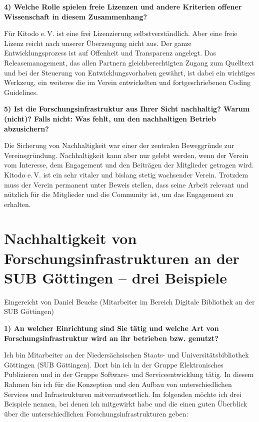 \documentclass[a4paper,
fontsize=11pt,
oneside,
numbers=noperiodatend,
parskip=half-,
bibliography=totoc,
final
]{scrartcl}
\begin{document}
\textbf{4) Welche Rolle spielen freie Lizenzen und andere Kriterien
offener Wissenschaft in diesem Zusammenhang?}

Für Kitodo e.\,V. ist eine frei Lizenzierung selbstverständlich. Aber
eine freie Lizenz reicht nach unserer Überzeugung nicht aus. Der ganze
Entwicklungsprozess ist auf Offenheit und Transparenz angelegt. Das
Releasemanagement, das allen Partnern gleichberechtigten Zugang zum
Quelltext und bei der Steuerung von Entwicklungsvorhaben gewährt, ist
dabei ein wichtiges Werkzeug, ein weiteres die im Verein entwickelten
und fortgeschriebenen Coding Guidelines.

\textbf{5) Ist die Forschungsinfrastruktur aus Ihrer Sicht nachhaltig?
Warum (nicht)? Falls nicht: Was fehlt, um den nachhaltigen Betrieb
abzusichern?}

Die Sicherung von Nachhaltigkeit war einer der zentralen Beweggründe zur
Vereinsgründung. Nachhaltigkeit kann aber nur gelebt werden, wenn der
Verein vom Interesse, dem Engagement und den Beiträgen der Mitglieder
getragen wird. Kitodo e.\,V. ist ein sehr vitaler und bislang stetig
wachsender Verein. Trotzdem muss der Verein permanent unter Beweis
stellen, dass seine Arbeit relevant und nützlich für die Mitglieder und
die Community ist, um das Engagement zu erhalten.

\hypertarget{nachhaltigkeit-von-forschungsinfrastrukturen-an-der-sub-guxf6ttingen-drei-beispiele}{%
\section{Nachhaltigkeit von Forschungsinfrastrukturen an der SUB Göttingen -- drei Beispiele}\label{nachhaltigkeit-von-forschungsinfrastrukturen-an-der-sub-guxf6ttingen-drei-beispiele}}

Eingereicht von Daniel Beucke (Mitarbeiter im Bereich Digitale
Bibliothek an der SUB Göttingen)

\textbf{1) An welcher Einrichtung sind Sie tätig und welche Art von
Forschungsinfrastruktur wird an ihr betrieben bzw. genutzt?}

Ich bin Mitarbeiter an der Niedersächsischen Staats- und
Universitätsbibliothek Göttingen (SUB Göttingen). Dort bin ich in der
Gruppe Elektronisches Publizieren und in der Gruppe Software- und
Serviceentwicklung tätig. In diesem Rahmen bin ich für die Konzeption
und den Aufbau von unterschiedlichen Services und Infrastrukturen
mitverantwortlich. Im folgenden möchte ich drei Beispiele nennen, bei
denen ich mitgewirkt habe und die einen guten Überblick über die
unterschiedlichen Forschungsinfrastrukturen geben:
\end{document}
